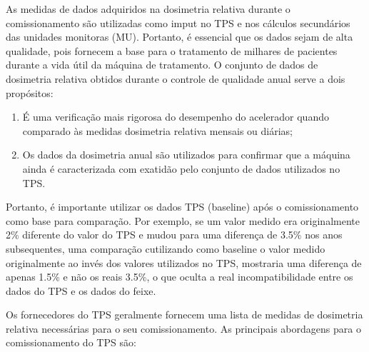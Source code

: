 \documentclass[11pt,a4paper]{article}
\newcounter{exemplo}
\begin{document}
	As medidas de dados adquiridos na dosimetria relativa durante o comissionamento são utilizadas como imput no TPS e nos cálculos secundários das unidades monitoras (MU). Portanto, é essencial que os dados sejam de alta qualidade, pois fornecem a base para o tratamento de milhares de pacientes durante a vida útil da máquina de tratamento. O conjunto de dados de dosimetria relativa obtidos durante o controle de qualidade anual serve a dois propósitos:
	
	\begin{enumerate}[label=\textcolor{CarnationPink}{\arabic*${}^\circ $}]
		\item É uma verificação mais rigorosa do desempenho do acelerador quando comparado às medidas dosimetria relativa mensais ou diárias; 
		\item Os dados da dosimetria anual são utilizados para confirmar que a máquina ainda é caracterizada com exatidão pelo conjunto de dados utilizados no TPS.
	\end{enumerate}
	
	Portanto, é importante utilizar os dados TPS (baseline) após o comissionamento como base para comparação. Por exemplo, se um valor medido era originalmente 2\% diferente do valor do TPS e mudou para uma diferença de 3.5\%  nos anos subsequentes, uma comparação cutilizando como baseline o valor medido originalmente ao invés dos valores utilizados no TPS, mostraria uma diferença de apenas 1.5\% e não os reais 3.5\%, o que oculta a real incompatibilidade  entre os dados do TPS e os dados do feixe.

	Os fornecedores do TPS geralmente fornecem uma lista de medidas de dosimetria relativa necessárias para o seu comissionamento. As principais abordagens para o comissionamento do TPS são:
\end{document}
